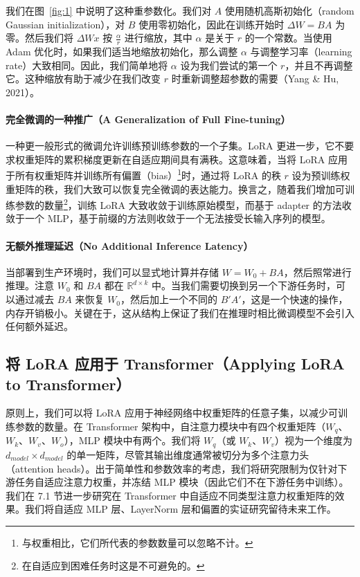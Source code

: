 \documentclass[11pt,UTF8,fontset=fandol]{ctexart}
\newcommand{\bbR}{\mathbb{R}}
\begin{document}
我们在图~\ref{fig:1} 中说明了这种重参数化。我们对 $A$ 使用随机高斯初始化（random Gaussian initialization），对 $B$ 使用零初始化，因此在训练开始时 $\Delta W=BA$ 为零。然后我们将 $\Delta Wx$ 按 $\frac{\alpha}{r}$ 进行缩放，其中 $\alpha$ 是关于 $r$ 的一个常数。当使用 Adam 优化时，如果我们适当地缩放初始化，那么调整 $\alpha$ 与调整学习率（learning rate）大致相同。因此，我们简单地将 $\alpha$ 设为我们尝试的第一个 $r$，并且不再调整它。这种缩放有助于减少在我们改变 $r$ 时重新调整超参数的需要（Yang \& Hu, 2021）。

\paragraph{完全微调的一种推广（A Generalization of Full Fine-tuning）}一种更一般形式的微调允许训练预训练参数的一个子集。LoRA 更进一步，它不要求权重矩阵的累积梯度更新在自适应期间具有满秩。这意味着，当将 LoRA 应用于所有权重矩阵并训练所有偏置（bias）\footnote{与权重相比，它们所代表的参数数量可以忽略不计。}时，通过将 LoRA 的秩 $r$ 设为预训练权重矩阵的秩，我们大致可以恢复完全微调的表达能力。换言之，随着我们增加可训练参数的数量\footnote{在自适应到困难任务时这是不可避免的。}，训练 LoRA 大致收敛于训练原始模型，而基于 adapter 的方法收敛于一个 MLP，基于前缀的方法则收敛于一个无法接受长输入序列的模型。

\paragraph{无额外推理延迟（No Additional Inference Latency）}当部署到生产环境时，我们可以显式地计算并存储 $W=W_0+BA$，然后照常进行推理。注意 $W_0$ 和 $BA$ 都在 $\bbR^{d\times k}$ 中。当我们需要切换到另一个下游任务时，可以通过减去 $BA$ 来恢复 $W_0$，然后加上一个不同的 $B'A'$，这是一个快速的操作，内存开销极小。关键在于，这从结构上保证了我们在推理时相比微调模型不会引入任何额外延迟。

\subsection{将 LoRA 应用于 Transformer（Applying LoRA to Transformer）}

原则上，我们可以将 LoRA 应用于神经网络中权重矩阵的任意子集，以减少可训练参数的数量。在 Transformer 架构中，自注意力模块中有四个权重矩阵（$W_q$、$W_k$、$W_v$、$W_o$），MLP 模块中有两个。我们将 $W_q$（或 $W_k$、$W_v$）视为一个维度为 $d_{model}\times d_{model}$ 的单一矩阵，尽管其输出维度通常被切分为多个注意力头（attention heads）。出于简单性和参数效率的考虑，我们将研究限制为仅针对下游任务自适应注意力权重，并冻结 MLP 模块（因此它们不在下游任务中训练）。我们在 7.1 节进一步研究在 Transformer 中自适应不同类型注意力权重矩阵的效果。我们将自适应 MLP 层、LayerNorm 层和偏置的实证研究留待未来工作。
\end{document}
